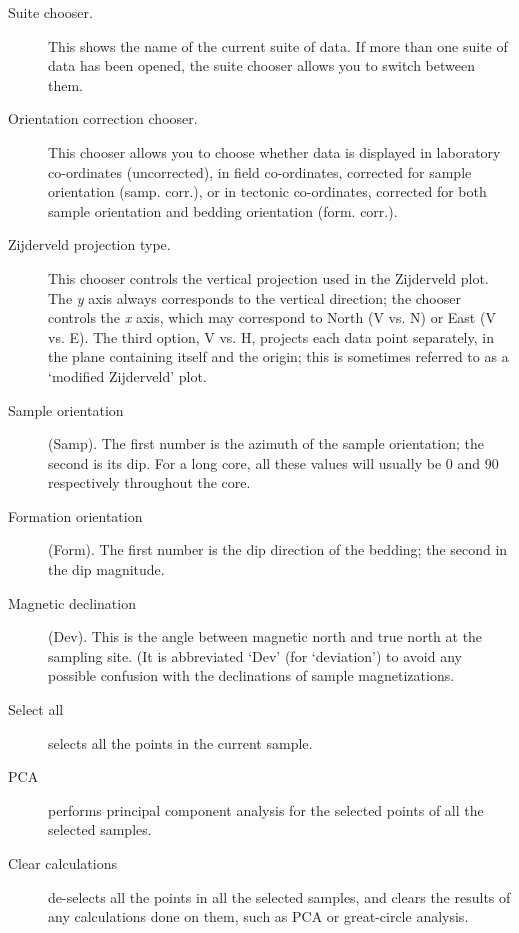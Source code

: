 \documentclass[a4paper,british]{article}
\newcommand{\ppcmd}[1]{\textsf{#1}} %
\newcommand{\caps}[1]{\MakeTextUppercase{#1}} %
\begin{document}
\begin{description}

\item[Suite chooser.] This shows the name of the current suite of
data. If more than one suite of data has been opened, the suite chooser
allows you to switch between them.

\item[Orientation correction chooser.] This chooser allows you to
choose whether data is displayed in laboratory co-ordinates
(\ppcmd{uncorrected}), in field co-ordinates, corrected for sample orientation
(\ppcmd{samp. corr.}), or in tectonic co-ordinates, corrected for both
sample orientation and bedding orientation (\ppcmd{form. corr.}).

\item[Zijderveld projection type.] This chooser controls the vertical
projection used in the Zijderveld plot. The {\em y} axis always corresponds
to the vertical direction; the chooser controls the {\em x} axis, which may
correspond to North (\ppcmd{V vs. N}) or East (\ppcmd{V vs. E}). The third
option, \ppcmd{V vs. H}, projects each data point separately, in the plane
containing itself and the origin; this is sometimes referred to as a
`modified Zijderveld' plot.

\item[Sample orientation] (\ppcmd{Samp}). The first number is the
azimuth of the sample orientation; the second is its dip. For a long core,
all these values will usually be 0 and 90 respectively throughout the core.

\item[Formation orientation] (\ppcmd{Form}). The first number is the
dip direction of the bedding; the second in the dip magnitude.

\item[Magnetic declination] (\ppcmd{Dev}). This is the angle between
magnetic north and true north at the sampling site. (It is abbreviated
`Dev' (for `deviation') to avoid any possible confusion with the
declinations of sample magnetizations.

\item[Select all] selects all the points in the current sample.

\item[\caps{Pca}] performs principal component analysis for the
selected points of all the selected samples.

\item[Clear calculations] de-selects all the points in all the
selected samples, and clears the results of any calculations done on them,
such as \caps{pca} or great-circle analysis.

\end{description}
\end{document}
